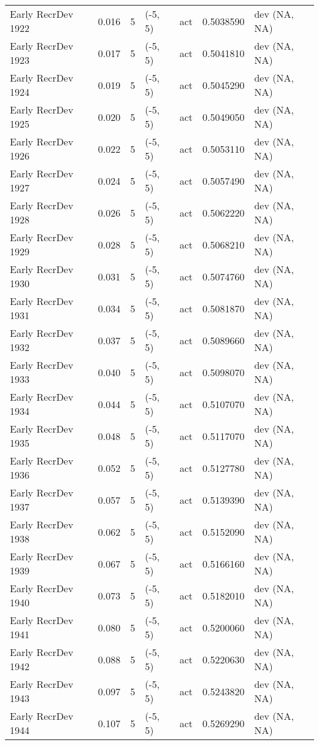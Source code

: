 \documentclass[11pt,
  english,
  letterpaper,
]{article}
\begin{document}
\begin{landscape}
\begin{longtable}[t]{>{\raggedright\arraybackslash}p{7cm}lllll>{\raggedright\arraybackslash}p{4cm}}
Early RecrDev 1922 & 0.016 & 5 & (-5, 5) & act & 0.5038590 & dev (NA, NA)\\
Early RecrDev 1923 & 0.017 & 5 & (-5, 5) & act & 0.5041810 & dev (NA, NA)\\
Early RecrDev 1924 & 0.019 & 5 & (-5, 5) & act & 0.5045290 & dev (NA, NA)\\
Early RecrDev 1925 & 0.020 & 5 & (-5, 5) & act & 0.5049050 & dev (NA, NA)\\
Early RecrDev 1926 & 0.022 & 5 & (-5, 5) & act & 0.5053110 & dev (NA, NA)\\
Early RecrDev 1927 & 0.024 & 5 & (-5, 5) & act & 0.5057490 & dev (NA, NA)\\
Early RecrDev 1928 & 0.026 & 5 & (-5, 5) & act & 0.5062220 & dev (NA, NA)\\
Early RecrDev 1929 & 0.028 & 5 & (-5, 5) & act & 0.5068210 & dev (NA, NA)\\
Early RecrDev 1930 & 0.031 & 5 & (-5, 5) & act & 0.5074760 & dev (NA, NA)\\
Early RecrDev 1931 & 0.034 & 5 & (-5, 5) & act & 0.5081870 & dev (NA, NA)\\
Early RecrDev 1932 & 0.037 & 5 & (-5, 5) & act & 0.5089660 & dev (NA, NA)\\
Early RecrDev 1933 & 0.040 & 5 & (-5, 5) & act & 0.5098070 & dev (NA, NA)\\
Early RecrDev 1934 & 0.044 & 5 & (-5, 5) & act & 0.5107070 & dev (NA, NA)\\
Early RecrDev 1935 & 0.048 & 5 & (-5, 5) & act & 0.5117070 & dev (NA, NA)\\
Early RecrDev 1936 & 0.052 & 5 & (-5, 5) & act & 0.5127780 & dev (NA, NA)\\
Early RecrDev 1937 & 0.057 & 5 & (-5, 5) & act & 0.5139390 & dev (NA, NA)\\
Early RecrDev 1938 & 0.062 & 5 & (-5, 5) & act & 0.5152090 & dev (NA, NA)\\
Early RecrDev 1939 & 0.067 & 5 & (-5, 5) & act & 0.5166160 & dev (NA, NA)\\
Early RecrDev 1940 & 0.073 & 5 & (-5, 5) & act & 0.5182010 & dev (NA, NA)\\
Early RecrDev 1941 & 0.080 & 5 & (-5, 5) & act & 0.5200060 & dev (NA, NA)\\
Early RecrDev 1942 & 0.088 & 5 & (-5, 5) & act & 0.5220630 & dev (NA, NA)\\
Early RecrDev 1943 & 0.097 & 5 & (-5, 5) & act & 0.5243820 & dev (NA, NA)\\
Early RecrDev 1944 & 0.107 & 5 & (-5, 5) & act & 0.5269290 & dev (NA, NA)\\

\end{longtable}
\end{landscape}
\end{document}

